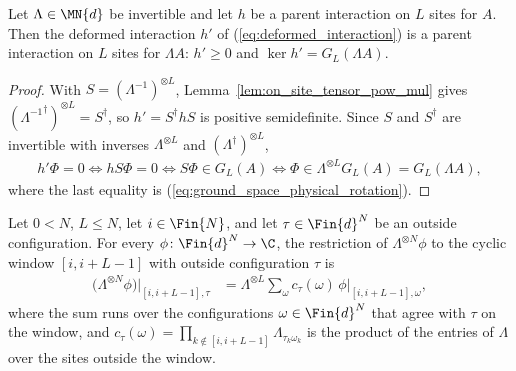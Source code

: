 \begin{lemma}\label{thm:deformed_interaction_parent}
    \leanok
    Let $\Lambda\in\MN{d}$ be invertible and let $h$ be a parent interaction on $L$
    sites for $A$. Then the deformed interaction $h'$ of
    (\ref{eq:deformed_interaction}) is a parent interaction on $L$ sites for
    $\Lambda A$: $h'\ge0$ and $\ker h'=G_L(\Lambda A)$.
\end{lemma}

\begin{proof}
    \leanok
    With $S=(\Lambda^{-1})^{\otimes L}$, Lemma~\ref{lem:on_site_tensor_pow_mul}
    gives $({\Lambda^{-1}}^\dagger)^{\otimes L}=S^\dagger$, so $h'=S^\dagger hS$
    is positive semidefinite. Since $S$ and $S^\dagger$ are invertible with
    inverses $\Lambda^{\otimes L}$ and $(\Lambda^\dagger)^{\otimes L}$,
    \begin{align}
        h'\Phi=0
        \iff hS\Phi=0
        \iff S\Phi\in G_L(A)
        \iff \Phi\in\Lambda^{\otimes L}G_L(A)
        =G_L(\Lambda A),
        \label{eq:deformed_interaction_kernel}
    \end{align}
    where the last equality is (\ref{eq:ground_space_physical_rotation}).
\end{proof}

\begin{lemma}\label{lem:cyclic_restrict_tensor_pow}
    \leanok
    Let $0<N$, $L\le N$, let $i\in\Fin{N}$, and let $\tau\in\Fin{d}^{N}$ be an
    outside configuration. For every $\phi\colon\Fin{d}^{N}\to\C$, the restriction of
    $\Lambda^{\otimes N}\phi$ to the cyclic window $[i,i+L-1]$ with outside
    configuration $\tau$ is
    \begin{align}
        \big(\Lambda^{\otimes N}\phi\big)\big|_{[i,i+L-1],\tau}
         & =\Lambda^{\otimes L}\sum_{\omega}c_{\tau}(\omega)\,
        \phi\big|_{[i,i+L-1],\omega},
        \label{eq:cyclic_restrict_tensor_pow}
    \end{align}
    where the sum runs over the configurations $\omega\in\Fin{d}^{N}$ that agree
    with $\tau$ on the window, and
    $c_\tau(\omega)=\prod_{k\notin[i,i+L-1]}\Lambda_{\tau_k\omega_k}$ is the product
    of the entries of $\Lambda$ over the sites outside the window.
\end{lemma}

